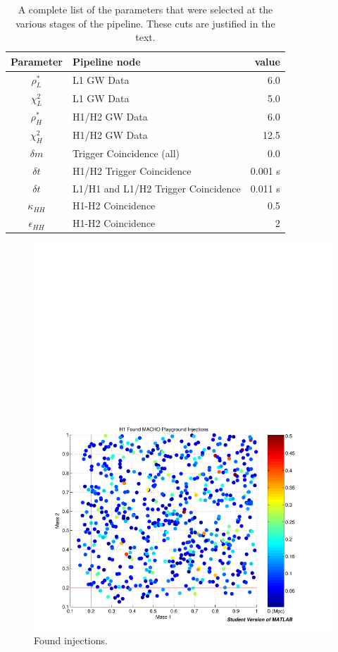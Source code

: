 \begin{table}
\caption{\label{t:ifo_params}%
A complete list of the parameters that were selected at the various
stages of the pipeline.   These cuts are justified in the text.
}
\begin{tabular}{clr}
Parameter & Pipeline node & value \\
\hline 
$\rho^\ast_L$ & L1 GW Data & 6.0 \\
$\chi^2_L$ & L1 GW Data & 5.0 \\
$\rho^\ast_H$ & H1/H2 GW Data & 6.0 \\
$\chi^2_H$ & H1/H2 GW Data & 12.5 \\
$\delta m$ & Trigger Coincidence (all) & 0.0 \\
$\delta t$ & H1/H2 Trigger Coincidence & 0.001 s \\
$\delta t$ & L1/H1 and L1/H2 Trigger Coincidence & 0.011 s \\
$\kappa_{HH}$ & H1-H2 Coincidence & 0.5 \\
$\epsilon_{HH}$ & H1-H2 Coincidence & 2
\end{tabular}
\end{table}




\begin{figure}[p]
\begin{center}
\includegraphics[width=\textwidth]{analysis/figures/m1m2_found}
\end{center}
\caption{\label{f:m1m2_found}%
Found injections.
}
\end{figure}

